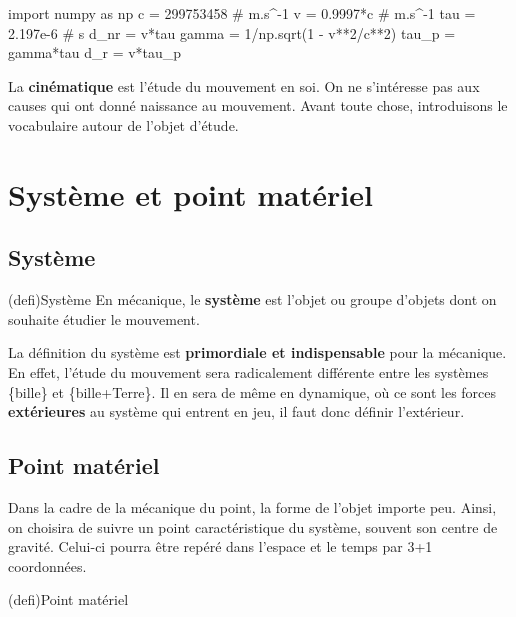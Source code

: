 \documentclass[../../main/main.tex]{subfiles}
\begin{document}
\vfill
\minitoc
\vfill

\newpage

\begin{pycode}
	import numpy as np
	c = 299753458 # m.s^-1
	v = 0.9997*c  # m.s^-1
	tau = 2.197e-6 # s
	d_nr = v*tau
	gamma = 1/np.sqrt(1 - v**2/c**2)
	tau_p = gamma*tau
	d_r = v*tau_p
\end{pycode}

La \textbf{cinématique} est l'étude du mouvement en soi. On ne s'intéresse pas
aux causes qui ont donné naissance au mouvement. Avant toute chose, introduisons
le vocabulaire autour de l'objet d'étude.

\section{Système et point matériel}
\subsection{Système}
\begin{tcb*}(defi){Système}
	En mécanique, le \textbf{système} est l'objet ou groupe
	d'objets dont on souhaite étudier le mouvement.
\end{tcb*}

La définition du système est \textbf{primordiale et indispensable} pour la
mécanique. En effet, l'étude du mouvement sera radicalement différente entre les
systèmes \{bille\} et \{bille+Terre\}. Il en sera de même en dynamique, où ce
sont les forces \textbf{extérieures} au système qui entrent en jeu, il faut donc
définir l'extérieur.

\subsection{Point matériel}

Dans la cadre de la mécanique du point, la forme de l'objet importe peu. Ainsi,
on choisira de suivre un point caractéristique du système, souvent son centre de
gravité. Celui-ci pourra être repéré dans l'espace et le temps par 3+1
coordonnées.

\begin{tcb*}(defi){Point matériel}
\end{tcb*}
\end{document}
